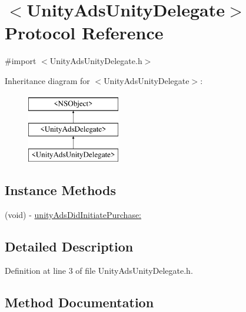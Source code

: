 \hypertarget{protocol_unity_ads_unity_delegate-p}{}\section{$<$Unity\+Ads\+Unity\+Delegate$>$ Protocol Reference}
\label{protocol_unity_ads_unity_delegate-p}


{\ttfamily \#import $<$Unity\+Ads\+Unity\+Delegate.\+h$>$}

Inheritance diagram for $<$Unity\+Ads\+Unity\+Delegate$>$\+:\begin{figure}[H]
\begin{center}
\leavevmode
\includegraphics[height=3.000000cm]{protocol_unity_ads_unity_delegate-p}
\end{center}
\end{figure}
\subsection*{Instance Methods}
\begin{DoxyCompactItemize}
\item 
(void) -\/ \mbox{\hyperlink{protocol_unity_ads_unity_delegate-p_ae00af02ef01e49c26d28eb958edac5ce}{unity\+Ads\+Did\+Initiate\+Purchase\+:}}
\end{DoxyCompactItemize}


\subsection{Detailed Description}


Definition at line 3 of file Unity\+Ads\+Unity\+Delegate.\+h.



\subsection{Method Documentation}
\mbox{\label{protocol_unity_ads_unity_delegate-p_ae00af02ef01e49c26d28eb958edac5ce}} 

